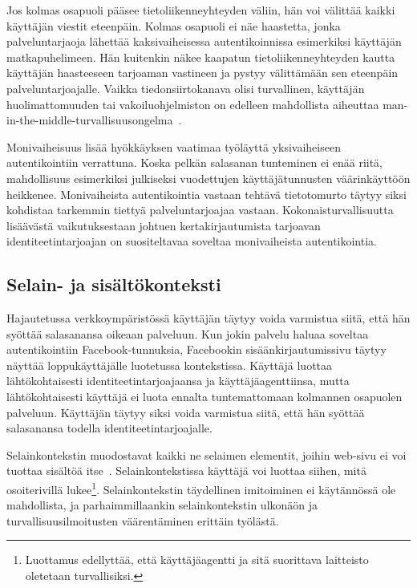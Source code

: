 \documentclass[finnish,gradu]{tktltiki}
\begin{document}
  Jos kolmas osapuoli pääsee tietoliikenneyhteyden väliin, hän voi välittää kaikki käyttäjän viestit eteenpäin. Kolmas osapuoli ei näe haastetta, jonka palveluntarjaoja lähettää kaksivaiheisessa autentikoinnissa esimerkiksi käyttäjän matkapuhelimeen. Hän kuitenkin näkee kaapatun tietoliikenneyhteyden kautta käyttäjän haasteeseen tarjoaman vastineen ja pystyy välittämään sen eteenpäin palveluntarjoajalle. Vaikka tiedonsiirtokanava olisi turvallinen, käyttäjän huolimattomuuden tai vakoiluohjelmiston on edelleen mahdollista aiheuttaa man-in-the-middle-tur\-val\-li\-suusongelma~\cite{schneier_2factor_2012}.

  Monivaiheisuus lisää hyökkäyksen vaatimaa työläyttä yksivaiheiseen autentikointiin verrattuna. Koska pelkän salasanan tunteminen ei enää riitä, mahdollisuus esimerkiksi julkiseksi vuodettujen käyttäjätunnusten väärinkäyttöön heikkenee. Monivaiheista autentikointia vastaan tehtävä tietotomurto täytyy siksi kohdistaa tarkemmin tiettyä palveluntarjoajaa vastaan. Kokonaisturvallisuutta lisäävästä vaikutuksestaan johtuen kertakirjautumista tarjoavan identiteetintarjoajan on suositeltavaa soveltaa monivaiheista autentikointia.






  \subsection{Selain- ja sisältökonteksti} %
  \label{sub:selainkonteksti_vs_applikaatiokonteksti}

  Hajautetussa verkkoympäristössä käyttäjän täytyy voida varmistua siitä, että hän syöttää salasanansa oikeaan palveluun. Kun jokin palvelu haluaa soveltaa autentikointiin Facebook-tunnuksia, Facebookin sisäänkirjautumissivu täytyy näyttää loppukäyttäjälle luotetussa kontekstissa. Käyttäjä luottaa lähtökohtaisesti identiteetintarjoajaansa ja käyttäjäagenttiinsa, mutta lähtökohtaisesti käyttäjä ei luota ennalta tuntemattomaan kolmannen osapuolen palveluun. Käyttäjän täytyy siksi voida varmistua siitä, että hän syöttää salasanansa todella identiteetintarjoajalle.

  Selainkontekstin muodostavat kaikki ne selaimen elementit, joihin web-sivu ei voi tuottaa sisältöä itse~\cite{why_phishing_works_06}. Selainkontekstissa käyttäjä voi luottaa siihen, mitä osoiterivillä lukee\footnote{Luottamus edellyttää, että käyttäjäagentti ja sitä suorittava laitteisto oletetaan turvallisiksi.}. Selainkontekstin täydellinen imitoiminen ei käytännössä ole mahdollista, ja parhaimmillaankin selainkontekstin ulkonäön ja turvallisuusilmoitusten väärentäminen erittäin työlästä.
\end{document}
